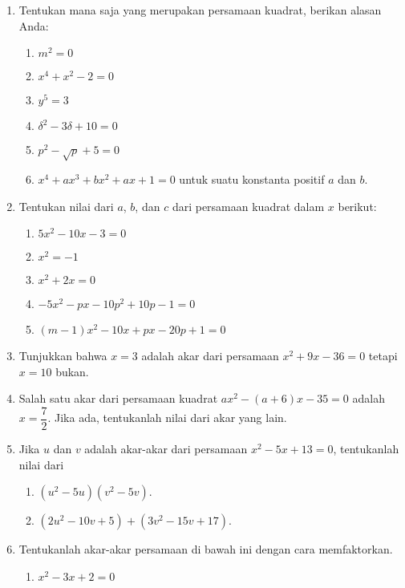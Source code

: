 		\begin{enumerate}[topsep=0pt]
			\item Tentukan mana saja yang merupakan persamaan kuadrat, berikan alasan Anda:
			\begin{enumerate}
				\item $ m^{2} = 0 $
				\item $ x^{4} + x^{2} - 2 = 0 $
				\item $ y^{5} = 3 $
				\item $ \delta^{2} - 3\delta + 10 = 0 $
				\item $ p^{2} - \sqrt{p} + 5 = 0 $
				\item $ x^{4} + ax^{3} + bx^{2} + ax + 1 = 0 $ untuk suatu konstanta positif $ a $ dan $ b $.
			\end{enumerate}
			\item Tentukan nilai dari $ a $, $ b $, dan $ c $ dari persamaan kuadrat dalam $ x $ berikut:
			\begin{enumerate}
				\item $ 5x^{2} - 10x - 3 = 0 $
				\item $ x^{2} = -1 $
				\item $ x^{2} + 2x = 0 $
				\item $ -5x^{2} - px - 10p^{2} + 10p - 1 = 0 $
				\item $ \left(m - 1\right)x^{2} - 10x + px - 20p + 1 = 0 $
			\end{enumerate}
			\item Tunjukkan bahwa $ x = 3 $ adalah akar dari persamaan $ x^{2} + 9x - 36 = 0 $ tetapi $ x = 10 $ bukan.
			\item Salah satu akar dari persamaan kuadrat $ ax^{2} - \left(a + 6\right)x - 35 = 0 $ adalah $ x = \dfrac{7}{2} $. Jika ada, tentukanlah nilai dari akar yang lain.
			\item Jika $ u $ dan $ v $ adalah akar-akar dari persamaan $ x^{2} - 5x + 13 = 0 $, tentukanlah nilai dari
			\begin{enumerate}
				\item $ \left(u^{2} - 5u\right)\left(v^{2} - 5v\right) $.
				\item $ \left(2u^{2} - 10v + 5\right) + \left(3v^{2} - 15v + 17\right) $.
			\end{enumerate}
			\item Tentukanlah akar-akar persamaan di bawah ini dengan cara memfaktorkan.
			\begin{multcols}
				\begin{enumerate}
					\item $ x^{2} - 3x + 2 = 0 $

\end{enumerate}
\end{multcols}
\end{enumerate}
